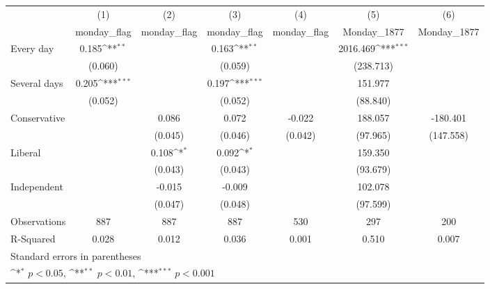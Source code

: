 {
\def\sym#1{\ifmmode^{#1}\else\(^{#1}\)\fi}
\begin{tabular}{l*{6}{c}}
\hline\hline
                    &\multicolumn{1}{c}{(1)}&\multicolumn{1}{c}{(2)}&\multicolumn{1}{c}{(3)}&\multicolumn{1}{c}{(4)}&\multicolumn{1}{c}{(5)}&\multicolumn{1}{c}{(6)}\\
                    &\multicolumn{1}{c}{monday\_flag}&\multicolumn{1}{c}{monday\_flag}&\multicolumn{1}{c}{monday\_flag}&\multicolumn{1}{c}{monday\_flag}&\multicolumn{1}{c}{Monday\_1877}&\multicolumn{1}{c}{Monday\_1877}\\
\hline
Every day           &       0.185\sym{**} &                     &       0.163\sym{**} &                     &    2016.469\sym{***}&                     \\
                    &     (0.060)         &                     &     (0.059)         &                     &   (238.713)         &                     \\
[1em]
Several days        &       0.205\sym{***}&                     &       0.197\sym{***}&                     &     151.977         &                     \\
                    &     (0.052)         &                     &     (0.052)         &                     &    (88.840)         &                     \\
[1em]
Conservative        &                     &       0.086         &       0.072         &      -0.022         &     188.057         &    -180.401         \\
                    &                     &     (0.045)         &     (0.046)         &     (0.042)         &    (97.965)         &   (147.558)         \\
[1em]
Liberal             &                     &       0.108\sym{*}  &       0.092\sym{*}  &                     &     159.350         &                     \\
                    &                     &     (0.043)         &     (0.043)         &                     &    (93.679)         &                     \\
[1em]
Independent         &                     &      -0.015         &      -0.009         &                     &     102.078         &                     \\
                    &                     &     (0.047)         &     (0.048)         &                     &    (97.599)         &                     \\
\hline
Observations        &         887         &         887         &         887         &         530         &         297         &         200         \\
R-Squared           &       0.028         &       0.012         &       0.036         &       0.001         &       0.510         &       0.007         \\
\hline\hline
\multicolumn{7}{l}{\footnotesize Standard errors in parentheses}\\
\multicolumn{7}{l}{\footnotesize \sym{*} \(p<0.05\), \sym{**} \(p<0.01\), \sym{***} \(p<0.001\)}\\
\end{tabular}
}
